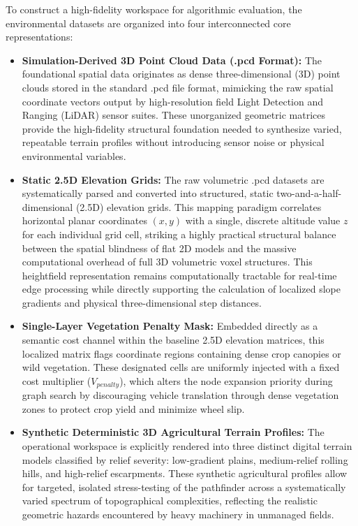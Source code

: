 To construct a high-fidelity workspace for algorithmic evaluation, the environmental datasets are
organized into four interconnected core representations:

\begin{itemize}
    \item \textbf{Simulation-Derived 3D Point Cloud Data (.pcd Format):} The foundational spatial data originates as dense three-dimensional (3D) point clouds stored in the standard .pcd file format, mimicking the raw spatial coordinate vectors output by high-resolution field Light Detection and Ranging (LiDAR) sensor suites. These unorganized geometric matrices provide the high-fidelity structural foundation needed to synthesize varied, repeatable terrain profiles without introducing sensor noise or physical environmental variables.

    \item \textbf{Static 2.5D Elevation Grids:} The raw volumetric .pcd datasets are systematically parsed and converted into structured, static two-and-a-half-dimensional (2.5D) elevation grids. This mapping paradigm correlates horizontal planar coordinates $(x, y)$ with a single, discrete altitude value $z$ for each individual grid cell, striking a highly practical structural balance between the spatial blindness of flat 2D models and the massive computational overhead of full 3D volumetric voxel structures. This heightfield representation remains computationally tractable for real-time edge processing while directly supporting the calculation of localized slope gradients and physical three-dimensional step distances.

    \item \textbf{Single-Layer Vegetation Penalty Mask:} Embedded directly as a semantic cost channel within the baseline 2.5D elevation matrices, this localized matrix flags coordinate regions containing dense crop canopies or wild vegetation. These designated cells are uniformly injected with a fixed cost multiplier ($V_{penalty}$), which alters the node expansion priority during graph search by discouraging vehicle translation through dense vegetation zones to protect crop yield and minimize wheel slip.

    \item \textbf{Synthetic Deterministic 3D Agricultural Terrain Profiles:} The operational workspace is explicitly rendered into three distinct digital terrain models classified by relief severity: low-gradient plains, medium-relief rolling hills, and high-relief escarpments. These synthetic agricultural profiles allow for targeted, isolated stress-testing of the pathfinder across a systematically varied spectrum of topographical complexities, reflecting the realistic geometric hazards encountered by heavy machinery in unmanaged fields.
\end{itemize}

